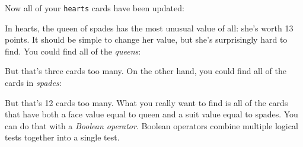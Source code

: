 \documentclass[
  letterpaper,
  DIV=11,
  numbers=noendperiod]{scrbook}
\newenvironment{Shaded}{\begin{snugshade}}{\end{snugshade}}
\newcommand{\DocumentationTok}[1]{\textcolor[rgb]{0.37,0.37,0.37}{\textit{#1}}}
\newcommand{\NormalTok}[1]{\textcolor[rgb]{0.00,0.23,0.31}{#1}}
\newcommand{\SpecialCharTok}[1]{\textcolor[rgb]{0.37,0.37,0.37}{#1}}
\newcommand{\StringTok}[1]{\textcolor[rgb]{0.13,0.47,0.30}{#1}}
\begin{document}
Now all of your \texttt{hearts} cards have been updated:

\begin{Shaded}
\end{Shaded}

In hearts, the queen of spades has the most unusual value of all: she's
worth 13 points. It should be simple to change her value, but she's
surprisingly hard to find. You could find all of the \emph{queens}:

\begin{Shaded}
\end{Shaded}

But that's three cards too many. On the other hand, you could find all
of the cards in \emph{spades}:

\begin{Shaded}
\end{Shaded}

But that's 12 cards too many. What you really want to find is all of the
cards that have both a face value equal to queen and a suit value equal
to spades. You can do that with a \emph{Boolean operator}. Boolean
operators combine multiple logical tests together into a single test.
\end{document}
